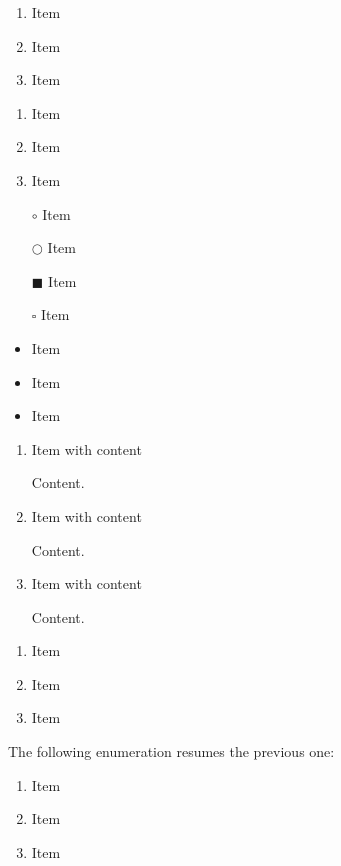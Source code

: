 \begin{enumerate}[label=\Alph*)]
    \item Item
    \item Item
    \item Item
\end{enumerate}
\bigbreak

\begin{enumerate}
    \item Item
    \item Item
    \item Item
\end{enumerate}
\bigbreak

\begin{itemize}
    \item[$\circ$] Item
    \item[$\bigcirc$] Item
    \item[$\blacksquare$] Item
    \item[$\square$] Item
\end{itemize}
\bigbreak
\begin{itemize}
    \item Item
    \item Item
    \item Item
\end{itemize}
\bigbreak

\begin{enumerate}

    \item Item with content
    
Content. 

    \item Item with content
    
Content. 

    \item Item with content
    
Content. 

\end{enumerate}
\bigbreak

\begin{enumerate}
    \item Item
    \item Item
    \item Item
\end{enumerate}
The following enumeration resumes the previous one:
\begin{enumerate}[resume]
    \item Item
    \item Item
    \item Item
\end{enumerate}
\bigbreak


